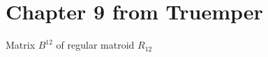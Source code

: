 \section{Chapter 9 from Truemper}

\begin{proposition}[9.2.14]
  \label{prop:9.2.14}
  Matrix $B^{12}$ of regular matroid $R_{12}$
\end{proposition}
